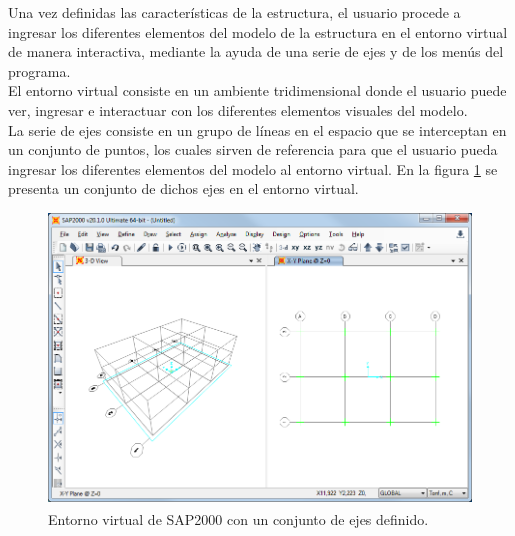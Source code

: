 Una vez definidas las características de la estructura, el usuario procede a ingresar los diferentes elementos del modelo de la estructura en el entorno virtual de manera interactiva, mediante la ayuda de una serie de ejes y de los menús del programa. \\

El entorno virtual consiste en un ambiente tridimensional donde el usuario puede ver, ingresar e interactuar con los diferentes elementos visuales del modelo.\\

La serie de ejes consiste en un grupo de líneas en el espacio que se interceptan en un conjunto de puntos, los cuales sirven de referencia para que el usuario pueda ingresar los diferentes elementos del modelo al entorno virtual. En la figura \ref{fig:sap2000_axes} se presenta un conjunto de dichos ejes en el entorno virtual.\\
\begin{figure}[ht]
    \centering
    \includegraphics[width=1\textwidth]{metodologia/sap2000_axes.png}
    \caption{Entorno virtual de SAP2000\textsuperscript{\textregistered} con un conjunto de ejes definido.}
    \label{fig:sap2000_axes}
\end{figure}

